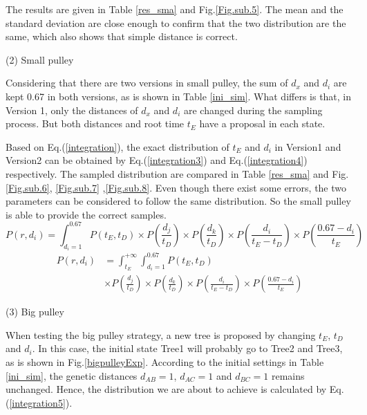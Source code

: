 \documentclass{bmcart}
\begin{document}
The results are given in Table \ref{res_sma} and Fig.\ref{Fig.sub.5}. The mean and the standard deviation are close enough to confirm that the two distribution are the same, which also shows that simple distance is correct.



(2) Small pulley

Considering that there are two versions in small pulley, the sum of ${d_x}$ and ${d_i}$ are kept 0.67 in both versions, as is shown in Table \ref{ini_sim}. What differs is that, in Version 1, only the distances of ${d_x}$ and ${d_i}$ are changed during the sampling process. But both distances and root time $t_E$ have a proposal in each state. 

Based on Eq.(\ref{integration}), the exact distribution of $t_E$ and ${d_i}$ in Version1 and Version2 can be obtained by Eq.(\ref{integration3}) and Eq.(\ref{integration4}) respectively. The sampled distribution are compared in Table \ref{res_sma} and Fig.\ref{Fig.sub.6}, \ref{Fig.sub.7} ,\ref{Fig.sub.8}. Even though there exist some errors, the two parameters can be considered to follow the same distribution. So the small pulley is able to provide the correct samples. 
\begin{equation}
\label{integration3}
P(r,{d_i}) = \int_{{d_i} = 1}^{0.67} {P({t_E},{t_D}) \times P(\frac{{{d_j}}}{{{t_D}}}) \times P(\frac{{{d_k}}}{{{t_D}}}) \times P(\frac{{{d_i}}}{{{t_E} - {t_D}}}) \times P(\frac{{0.67 - {d_i}}}{{{t_E}}})}
\end{equation}
\begin{equation}
\label{integration4}
\begin{aligned}
P(r,{d_i}) &= \int_{{t_E}}^{ + \infty } {\int_{{d_i} = 1}^{0.67} {P({t_E},{t_D})} } \\& \times P(\frac{{{d_j}}}{{{t_D}}}) \times P(\frac{{{d_k}}}{{{t_D}}}) \times P(\frac{{{d_i}}}{{{t_E} - {t_D}}}) \times P(\frac{{0.67 - {d_i}}}{{{t_E}}})
\end{aligned}
\end{equation}

(3) Big pulley

When testing the big pulley strategy, a new tree is proposed by changing $t_E$,  $t_D$ and $d_i$. In this case, the initial state Tree1  will probably go to Tree2 and Tree3, as is shown in Fig.\ref{bigpulleyExp}.  According to the initial settings in Table \ref{ini_sim}, the genetic distances $d_{AB} = 1$, $d_{AC}  = 1$ and $d_{BC} = 1$ remains unchanged. Hence, the distribution we are about to achieve is calculated by Eq.(\ref{integration5}).
\end{document}
